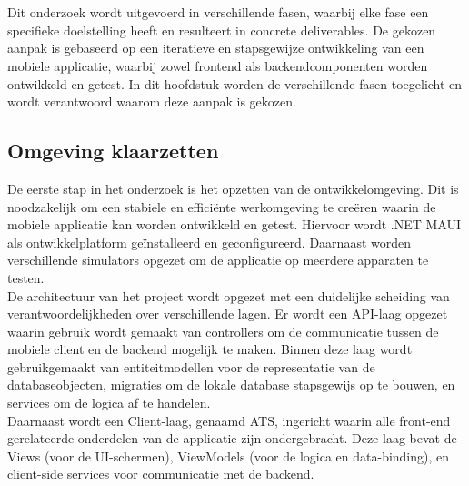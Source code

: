 
\chapter{}%
\label{ch:methodologie}

Dit onderzoek wordt uitgevoerd in verschillende fasen, waarbij elke fase een specifieke doelstelling heeft en resulteert in concrete deliverables. De gekozen aanpak is gebaseerd op een iteratieve en stapsgewijze ontwikkeling van een mobiele applicatie, waarbij zowel frontend als backendcomponenten worden ontwikkeld en getest. In dit hoofdstuk worden de verschillende fasen toegelicht en wordt verantwoord waarom deze aanpak is gekozen.

\section{Omgeving klaarzetten}

De eerste stap in het onderzoek is het opzetten van de ontwikkelomgeving. Dit is noodzakelijk om een stabiele en efficiënte werkomgeving te creëren waarin de mobiele applicatie kan worden ontwikkeld en getest. Hiervoor wordt .NET MAUI als ontwikkelplatform geïnstalleerd en geconfigureerd. Daarnaast worden verschillende simulators opgezet om de applicatie op meerdere apparaten te testen.\\

De architectuur van het project wordt opgezet met een duidelijke scheiding van verantwoordelijkheden over verschillende lagen. Er wordt een API-laag opgezet waarin gebruik wordt gemaakt van controllers om de communicatie tussen de mobiele client en de backend mogelijk te maken. Binnen deze laag wordt gebruikgemaakt van entiteitmodellen voor de representatie van de databaseobjecten, migraties om de lokale database stapsgewijs op te bouwen, en services om de logica af te handelen.\\

Daarnaast wordt een Client-laag, genaamd ATS, ingericht waarin alle front-end gerelateerde onderdelen van de applicatie zijn ondergebracht. Deze laag bevat de Views (voor de UI-schermen), ViewModels (voor de logica en data-binding), en client-side services voor communicatie met de backend. \\

